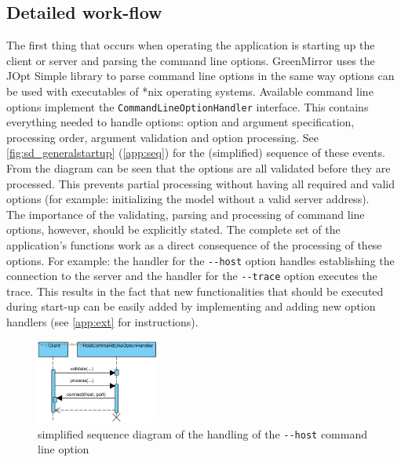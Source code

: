\subsection{Detailed work-flow}\label{sec:design;sub:detailedwf}
The first thing that occurs when operating the application is starting up the client or server and parsing the command line options. GreenMirror uses the JOpt Simple library \cite{joptsimple} to parse command line options in the same way options can be used with executables of *nix operating systems. Available command line options implement the \lstinline{CommandLineOptionHandler} interface. This contains everything needed to handle options: option and argument specification, processing order, argument validation and option processing. See \cref{fig:sd_generalstartup} (\cref{app:seq}) for the (simplified) sequence of these events. From the diagram can be seen that the options are all validated before they are processed. This prevents partial processing without having all required and valid options (for example: initializing the model without a valid server address).\\
The importance of the validating, parsing and processing of command line options, however, should be explicitly stated. The complete set of the application's functions work as a direct consequence of the processing of these options. For example: the handler for the \lstinline{--host} option handles establishing the connection to the server and the handler for the \lstinline{--trace} option executes the trace. This results in the fact that new functionalities that should be executed during start-up can be easily added by implementing and adding new option handlers (see \cref{app:ext} for instructions).
\par\begin{figure}\vspace{-20pt}
  \begin{center}
    \includegraphics[width=0.36\textwidth]{diagrams/SD_client_host}
  \end{center}
  \vspace{-20pt}\caption{simplified sequence diagram of the handling of the \lstinline{--host} command line option}\vspace{-15pt}
  \label{fig:sd_client_host}
\end{figure}
